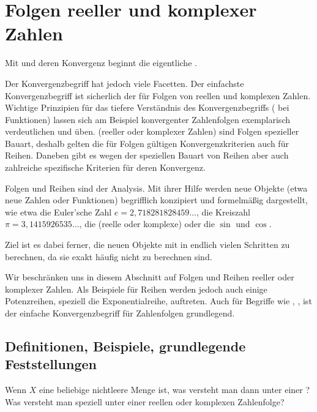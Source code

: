 \chapter{Folgen reeller und komplexer Zahlen}

Mit  und deren Konvergenz beginnt die eigentliche 
. 

Der Konvergenzbegriff hat jedoch viele Facetten. 
Der einfachste Konvergenzbegriff 
ist sicherlich der für Folgen von reellen und komplexen Zahlen. 
Wichtige Prinzipien für das tiefere Verständnis des Konvergenzbegriffs 
({\zB} bei Funktionen) lassen sich am Beispiel konvergenter Zahlenfolgen 
exemplarisch verdeutlichen und üben. 
 (reeller oder komplexer Zahlen) sind Folgen spezieller 
Bauart, deshalb gelten die für Folgen gültigen Konvergenzkriterien auch 
für Reihen. 
Daneben gibt es wegen der speziellen Bauart von Reihen aber auch zahlreiche 
spezifische Kriterien für deren Konvergenz. 

Folgen und Reihen sind  der 
Analysis. Mit ihrer Hilfe werden neue Objekte (etwa neue Zahlen oder 
Funktionen) begrifflich konzipiert und formelmäßig dargestellt, 
wie etwa die Euler'sche Zahl $e=2,718281828459\ldots$, die Kreiszahl 
$\pi=3,1415926535\ldots$, die (reelle oder komplexe) 
 oder die  
$\sin$ und $\cos$.

Ziel ist es dabei ferner, die neuen Objekte mit  in endlich vielen Schritten zu berechnen, 
da sie exakt häufig nicht zu berechnen sind.

Wir beschränken uns in diesem Abschnitt auf Folgen und Reihen reeller 
oder komplexer Zahlen. Als Beispiele für Reihen werden jedoch auch einige 
Potenzreihen, speziell die Exponentialreihe, auftreten. 
Auch für Begriffe wie , , 
 ist der einfache Konvergenzbegriff für 
Zahlenfolgen grundlegend. 

\section{Definitionen, Beispiele, grundlegende Feststellungen}

\begin{frage}%
  \label{02_fdef}
  Wenn $X$ eine beliebige nichtleere Menge ist, was versteht man dann 
  unter einer ?
  Was versteht man speziell unter einer reellen oder komplexen 
  Zahlenfolge? 
\end{frage}

